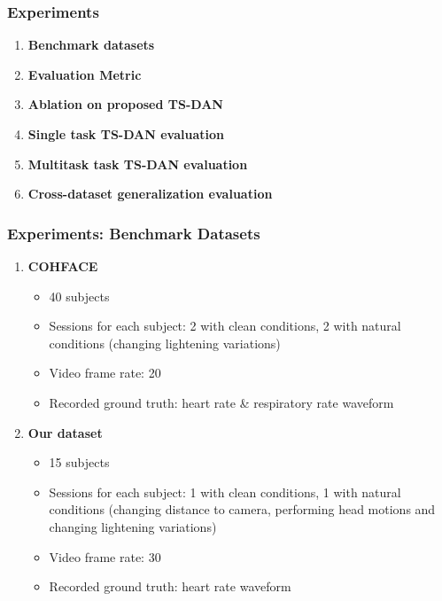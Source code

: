 \documentclass[aspectratio=169, table]{beamer}
\begin{document}
\begin{frame}
\frametitle{\textbf{Experiments}} %

\begin{enumerate}
  \item \textbf{Benchmark datasets}
  \item \textbf{Evaluation Metric}
  \item \textbf{Ablation on proposed TS-DAN}
   
  

  \item \textbf{Single task TS-DAN evaluation}
    \item \textbf{Multitask task TS-DAN evaluation}
    \item \textbf{Cross-dataset generalization evaluation}
\end{enumerate}

\end{frame}
\begin{frame}
	\frametitle{\textbf{Experiments: Benchmark Datasets}}
	\begin{enumerate}
        \item \textbf{COHFACE} \cite{heusch2017reproducible}
            \begin{itemize}
            \item 40 subjects
            \item Sessions for each subject: 2 with clean conditions, 2 with natural conditions (changing lightening variations)
            \item Video frame rate: 20
            \item Recorded ground truth: heart rate & respiratory rate waveform
            \end{itemize}
        \item \textbf{Our dataset}
            \begin{itemize}
            \item 15 subjects
            \item Sessions for each subject: 1 with clean conditions, 1 with natural conditions (changing distance to camera, performing head motions and changing lightening variations)
            \item Video frame rate: 30
            \item Recorded ground truth: heart rate waveform
            \end{itemize}
    \end{enumerate}

\end{frame}
\end{document}
